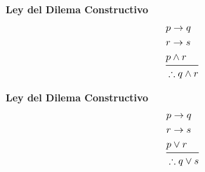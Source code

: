 \documentclass[12pt, fleqn]{report}                             %
\begin{document}
            \begin{multicols}{2}
                
                \large{\textbf{Ley del Dilema Constructivo}}
                    \begin{equation*}
                    \begin{split}
                        &p \to q             \\
                        &r \to s             \\
                        &p \land r           \\
                        \midrule
                        &\therefore q \land r
                    \end{split}
                    \end{equation*}

                \large{\textbf{Ley del Dilema Constructivo}}
                    \begin{equation*}
                    \begin{split}
                        &p \to q             \\
                        &r \to s             \\
                        &p \lor r            \\
                        \midrule
                        &\therefore q \lor s
                    \end{split}
                    \end{equation*}

            \end{multicols}

            \bigskip
\end{document}
